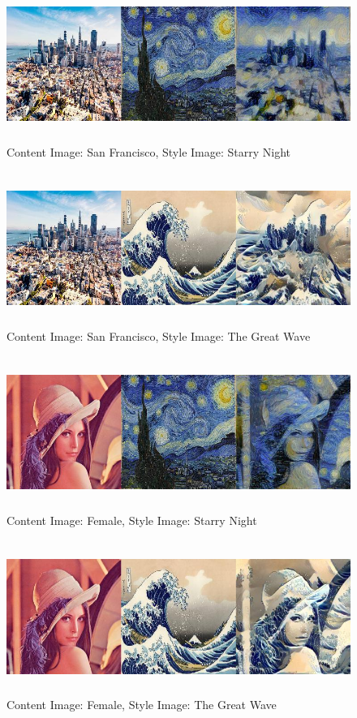 \documentclass{article}
\begin{document}
\begin{figure}[H]
    \centering
    \includegraphics[height=5cm, width=15cm]{sf_van_combined}
    \caption{Content Image: San Francisco, Style Image: Starry Night}
    \label{fig:comb1}
\end{figure}

\begin{figure}[H]
    \centering
    \includegraphics[height=5cm, width=15cm]{sf_wave_combined}
    \caption{Content Image: San Francisco, Style Image: The Great Wave}
    \label{fig:comb2}
\end{figure}

\begin{figure}[H]
    \centering
    \includegraphics[height=5cm, width=15cm]{female_van_combined}
    \caption{Content Image: Female, Style Image: Starry Night}
    \label{fig:comb3}
\end{figure}

\begin{figure}[H]
    \centering
    \includegraphics[height=5cm, width=15cm]{female_wave_combined}
    \caption{Content Image: Female, Style Image: The Great Wave}
    \label{fig:comb4}
\end{figure}
\end{document}
